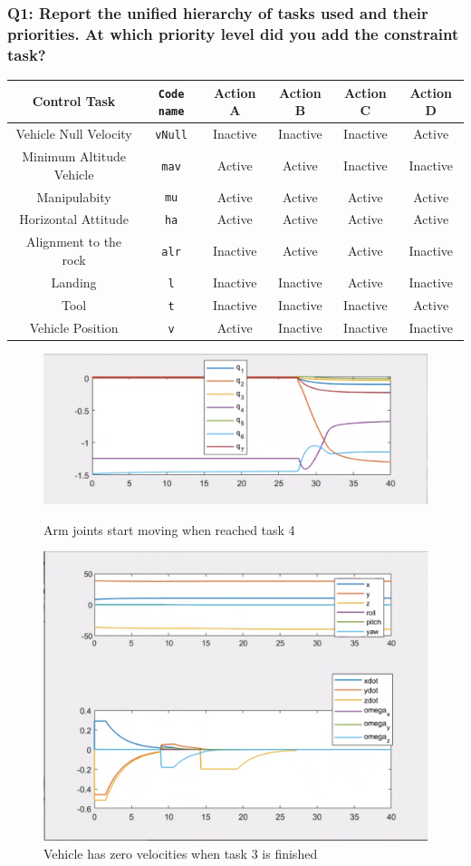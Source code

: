 \documentclass{article}
\begin{document}
\subsubsection{Q1: Report the unified hierarchy of tasks used and their priorities. At which priority level did you add the constraint task?}
\begin{center}
\begin{tabular}{ | c | c | c | c | c | c |}
\hline
 Control Task & \texttt{Code name} & Action A & Action B & Action C & Action D\\
 \hline
 Vehicle Null Velocity & \texttt{vNull} & Inactive & Inactive & Inactive & Active\\
 Minimum Altitude Vehicle &  \texttt{mav} & Active & Active & Inactive & Inactive \\  
 Manipulabity &  \texttt{mu} & Active & Active & Active & Active  \\
 Horizontal Attitude &  \texttt{ha} & Active & Active & Active & Active\\
 Alignment to the rock & \texttt{alr} & Inactive & Active & Active & Inactive \\
 Landing & \texttt{l} &Inactive & Inactive & Active & Inactive\\
 Tool  &  \texttt{t} & Inactive & Inactive & Inactive & Active\\
 Vehicle Position &  \texttt{v} &Active & Inactive & Inactive & Inactive\\
 \hline
\end{tabular}
\end{center}

\begin{figure}[htp]
\centering
\includegraphics[width=.6\textwidth]{411_q.png}\caption{Arm joints start moving when reached task 4}
\centering
\label{fig:411_arm}
\includegraphics[width=.6\textwidth]{411_ppdot.png}\caption{Vehicle has zero velocities when task 3 is finished}
\label{fig:411_vehicle}
\end{figure}
\end{document}

